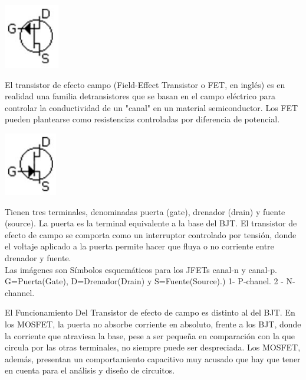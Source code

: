 \documentclass[10pt,a4paper]{article}
\begin{document}
\begin{center}
\includegraphics[scale=0.8]{3.png}
\end{center} 

El transistor de efecto campo (Field-Effect Transistor o FET, en inglés) es en realidad una familia detransistores que se basan en el campo eléctrico para controlar la conductividad de un "canal" en un material semiconductor. Los FET pueden plantearse como resistencias controladas por diferencia de potencial.\\

\begin{center}
\includegraphics[scale=0.8]{4.png}
\end{center} 

Tienen tres terminales, denominadas puerta (gate), drenador (drain) y fuente (source). La puerta es la terminal equivalente a la base del BJT. El transistor de efecto de campo se comporta como un interruptor controlado por tensión, donde el voltaje aplicado a la puerta permite hacer que fluya o no corriente entre drenador y fuente.\\
Las imágenes son Símbolos esquemáticos para los JFETs canal-n y canal-p. G=Puerta(Gate), D=Drenador(Drain) y S=Fuente(Source).) 1- P-chanel. 2 - N-channel.

El Funcionamiento Del Transistor de efecto de campo es distinto al del BJT. En los MOSFET, la puerta no absorbe corriente en absoluto, frente a los BJT, donde la corriente que atraviesa la base, pese a ser pequeña en comparación con la que circula por las otras terminales, no siempre puede ser despreciada. Los MOSFET, además, presentan un comportamiento capacitivo muy acusado que hay que tener en cuenta para el análisis y diseño de circuitos.
\end{document}
